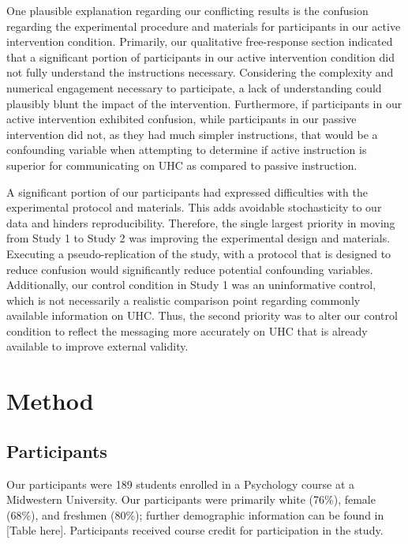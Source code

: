 \documentclass[
  english,
  man]{apa6}
\begin{document}
One plausible explanation regarding our conflicting results is the confusion regarding the experimental procedure and materials for participants in our active intervention condition. Primarily, our qualitative free-response section indicated that a significant portion of participants in our active intervention condition did not fully understand the instructions necessary. Considering the complexity and numerical engagement necessary to participate, a lack of understanding could plausibly blunt the impact of the intervention. Furthermore, if participants in our active intervention exhibited confusion, while participants in our passive intervention did not, as they had much simpler instructions, that would be a confounding variable when attempting to determine if active instruction is superior for communicating on UHC as compared to passive instruction.

A significant portion of our participants had expressed difficulties with the experimental protocol and materials. This adds avoidable stochasticity to our data and hinders reproducibility. Therefore, the single largest priority in moving from Study 1 to Study 2 was improving the experimental design and materials. Executing a pseudo-replication of the study, with a protocol that is designed to reduce confusion would significantly reduce potential confounding variables. Additionally, our control condition in Study 1 was an uninformative control, which is not necessarily a realistic comparison point regarding commonly available information on UHC. Thus, the second priority was to alter our control condition to reflect the messaging more accurately on UHC that is already available to improve external validity.

\hypertarget{method-1}{%
\section{Method}\label{method-1}}

\hypertarget{participants-1}{%
\subsection{Participants}\label{participants-1}}

Our participants were 189 students enrolled in a Psychology course at a Midwestern University. Our participants were primarily white (76\%), female (68\%), and freshmen (80\%); further demographic information can be found in {[}Table here{]}. Participants received course credit for participation in the study.
\end{document}
